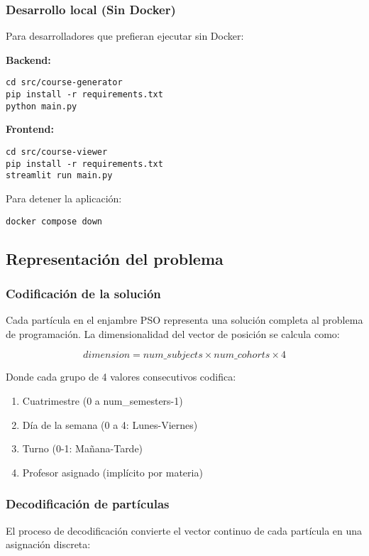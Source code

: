 \subsubsection{Desarrollo local (Sin Docker)}
Para desarrolladores que prefieran ejecutar sin Docker:

\textbf{Backend:}
\begin{verbatim}
cd src/course-generator
pip install -r requirements.txt
python main.py
\end{verbatim}

\textbf{Frontend:}
\begin{verbatim}
cd src/course-viewer
pip install -r requirements.txt
streamlit run main.py
\end{verbatim}

Para detener la aplicación:
\begin{verbatim}
docker compose down
\end{verbatim}

\subsection{Representación del problema}

\subsubsection{Codificación de la solución}
Cada partícula en el enjambre PSO representa una solución completa al problema de programación. La dimensionalidad del vector de posición se calcula como:

$$dimension = num\_subjects \times num\_cohorts \times 4$$

Donde cada grupo de 4 valores consecutivos codifica:
\begin{enumerate}
    \item Cuatrimestre (0 a num\_semesters-1)
    \item Día de la semana (0 a 4: Lunes-Viernes)
    \item Turno (0-1: Mañana-Tarde)
    \item Profesor asignado (implícito por materia)
\end{enumerate}

\subsubsection{Decodificación de partículas}
El proceso de decodificación convierte el vector continuo de cada partícula en una asignación discreta:

